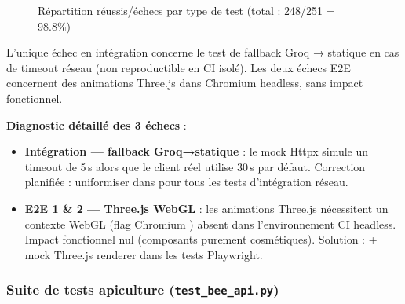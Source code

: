 \begin{figure}[H]
\centering
{}
\caption{Répartition réussis/échecs par type de test (total : 248/251 = 98.8\%)}
\label{fig:tests_bar}
\end{figure}

L'unique échec en intégration concerne le test de fallback Groq → statique
en cas de timeout réseau (non reproductible en CI isolé). Les deux échecs
E2E concernent des animations Three.js dans Chromium headless, sans impact
fonctionnel.

\textbf{Diagnostic détaillé des 3 échecs} :
\begin{itemize}
  \item \textbf{Intégration — fallback Groq→statique} : le mock Httpx simule
        un timeout de 5\,s alors que le client réel utilise 30\,s par défaut.
        Correction planifiée : uniformiser  dans
         pour tous les tests d'intégration réseau.
  \item \textbf{E2E 1 \& 2 — Three.js WebGL} : les animations Three.js
        nécessitent un contexte WebGL (flag Chromium )
        absent dans l'environnement CI headless. Impact fonctionnel nul
        (composants purement cosmétiques). Solution : 
        + mock Three.js renderer dans les tests Playwright.
\end{itemize}

\subsubsection*{Suite de tests apiculture (\texttt{test\_bee\_api.py})}

